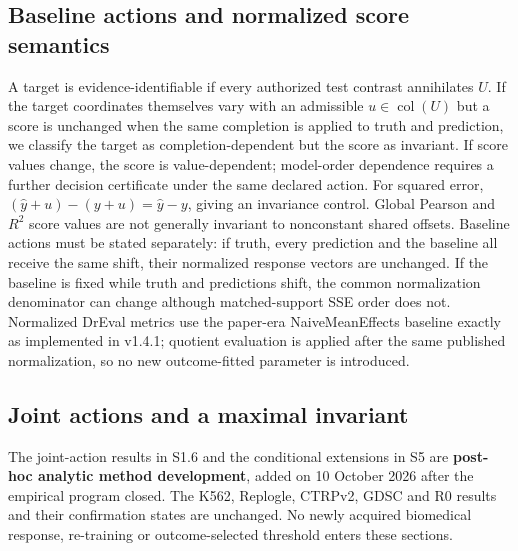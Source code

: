 \documentclass[11pt]{article}
\begin{document}
\subsection{Baseline actions and normalized score semantics}
A target is evidence-identifiable if every authorized test contrast annihilates $U$. If the target coordinates themselves vary with an admissible $u\in\operatorname{col}(U)$ but a score is unchanged when the same completion is applied to truth and prediction, we classify the target as completion-dependent but the score as invariant. If score values change, the score is value-dependent; model-order dependence requires a further decision certificate under the same declared action. For squared error, $(\hat y+u)-(y+u)=\hat y-y$, giving an invariance control. Global Pearson and $R^2$ score values are not generally invariant to nonconstant shared offsets. Baseline actions must be stated separately: if truth, every prediction and the baseline all receive the same shift, their normalized response vectors are unchanged. If the baseline is fixed while truth and predictions shift, the common normalization denominator can change although matched-support SSE order does not. Normalized DrEval metrics use the paper-era NaiveMeanEffects baseline exactly as implemented in v1.4.1; quotient evaluation is applied after the same published normalization, so no new outcome-fitted parameter is introduced.


\subsection{Joint actions and a maximal invariant}
The joint-action results in S1.6 and the conditional extensions in S5 are \textbf{post-hoc analytic method development}, added on 10 October 2026 after the empirical program closed. The K562, Replogle, CTRPv2, GDSC and R0 results and their confirmation states are unchanged. No newly acquired biomedical response, re-training or outcome-selected threshold enters these sections.
\end{document}
